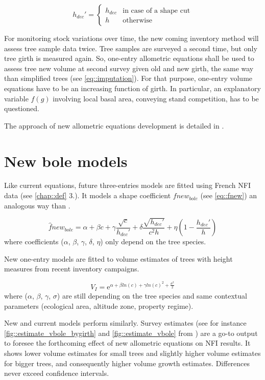 \[ h_{dec}' = \begin{cases}
h_{dec} & \text{in case of a shape cut}\\
h & \text{otherwise}
\end{cases} \]

For monitoring stock variations over time, the new coming inventory method will assess tree sample data twice. Tree samples are surveyed a second time, but only tree girth is measured again. So, one-entry allometric equations shall be used to assess tree new volume at second survey given old and new girth, the same way than simplified trees (see \ref{eq::imputation}). For that purpose, one-entry volume equations have to be an increasing function of girth. In particular, an explanatory variable \( f(g) \) involving local basal area, conveying stand competition, has to be questioned.  

The approach of new allometric equations development is detailed in \cite{Gohon2024}.  

\section{New bole models}

Like current equations, future three-entries models are fitted using French NFI data (see \ref{chap::def} 3.). It models a shape coefficient \( fnew_{bole} \) (see \ref{eq::fnew}) an analogous way than \cite{Morneau2016}.  

\[ \hat fnew_{bole} = \alpha + \beta c + \gamma \frac{\sqrt{c}}{h_{dec}'} + \delta \frac{\sqrt{h_{dec}'}}{c^2 h} + \eta \left( 1 - \frac{h_{dec}'}{h} \right) \]
where coefficients (\( \alpha \), \( \beta \), \( \gamma \), \( \delta \), \( \eta \)) only depend on the tree species.  

New one-entry models are fitted to volume estimates of trees with height measures from recent inventory campaigns.  

\[ V_{I} = \mathrm{e}^{\alpha + \beta ln(c) + \gamma ln(c)^2 + \frac{\sigma^2}{2}} \]
where (\( \alpha \), \( \beta \), \( \gamma \), \( \sigma \)) are still depending on the tree species and same contextual parameters (ecological area, altitude zone, property regime).  

New and current models perform similarly.  
Survey estimates (see for instance \ref{fig::estimate_vbole_bygirth} and \ref{fig::estimate_vbole} from \cite{Gohon2024}) are a go-to output to foresee the forthcoming effect of new allometric equations on NFI results. It shows lower volume estimates for small trees and slightly higher volume estimates for bigger trees, and consequently higher volume growth estimates. Differences never exceed confidence intervals.  

